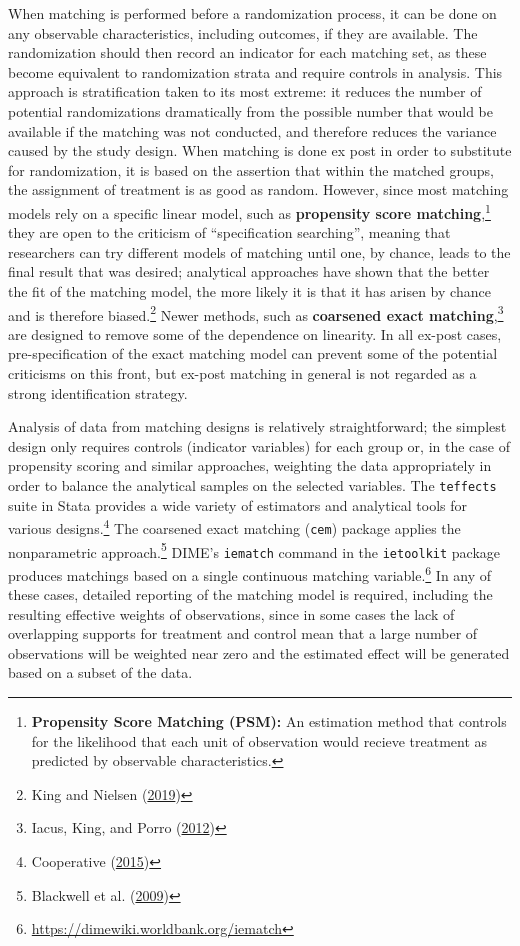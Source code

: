 \documentclass[
]{book}
\begin{document}
When matching is performed before a randomization process,
it can be done on any observable characteristics,
including outcomes, if they are available.
The randomization should then record an indicator for each matching set,
as these become equivalent to randomization strata and require controls in analysis.
This approach is stratification taken to its most extreme:
it reduces the number of potential randomizations dramatically
from the possible number that would be available
if the matching was not conducted,
and therefore reduces the variance caused by the study design.
When matching is done ex post in order to substitute for randomization,
it is based on the assertion that within the matched groups,
the assignment of treatment is as good as random.
However, since most matching models rely on a specific linear model,
such as \textbf{propensity score matching},\footnote{\textbf{Propensity Score Matching (PSM):} An estimation method that controls for the likelihood
  that each unit of observation would recieve treatment as predicted by observable characteristics.}
they are open to the criticism of ``specification searching'',
meaning that researchers can try different models of matching
until one, by chance, leads to the final result that was desired;
analytical approaches have shown that the better the fit of the matching model,
the more likely it is that it has arisen by chance and is therefore biased.\footnote{King and Nielsen (\protect\hyperlink{ref-king2019propensity}{2019})}
Newer methods, such as \textbf{coarsened exact matching},\footnote{Iacus, King, and Porro (\protect\hyperlink{ref-iacus2012causal}{2012})}
are designed to remove some of the dependence on linearity.
In all ex-post cases, pre-specification of the exact matching model
can prevent some of the potential criticisms on this front,
but ex-post matching in general is not regarded as a strong identification strategy.

Analysis of data from matching designs is relatively straightforward;
the simplest design only requires controls (indicator variables) for each group
or, in the case of propensity scoring and similar approaches,
weighting the data appropriately in order to balance the analytical samples on the selected variables.
The \texttt{teffects} suite in Stata provides a wide variety
of estimators and analytical tools for various designs.\footnote{Cooperative (\protect\hyperlink{ref-sscc2015}{2015})}
The coarsened exact matching (\texttt{cem}) package applies the nonparametric approach.\footnote{Blackwell et al. (\protect\hyperlink{ref-blackwell2009cem}{2009})}
DIME's \texttt{iematch} command in the \texttt{ietoolkit} package produces matchings based on a single continuous matching variable.\footnote{\url{https://dimewiki.worldbank.org/iematch}}
In any of these cases, detailed reporting of the matching model is required,
including the resulting effective weights of observations,
since in some cases the lack of overlapping supports for treatment and control
mean that a large number of observations will be weighted near zero
and the estimated effect will be generated based on a subset of the data.
\end{document}
